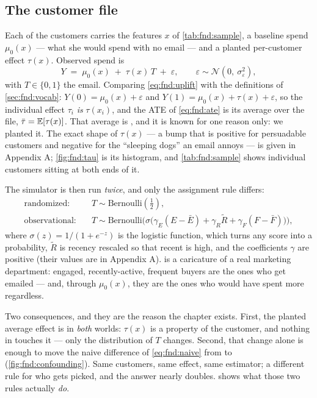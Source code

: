 \subsection*{The customer file}

Each of the \nbZeroNCustomers{} customers carries the features $x$ of \cref{tab:fnd:sample},
a baseline spend $\mu_0(x)$ --- what she would spend with no email --- and a planted
per-customer effect $\tau(x)$. Observed spend is
%
\begin{equation}
  Y \;=\; \mu_0(x) \;+\; \tau(x)\,T \;+\; \varepsilon,
  \qquad \varepsilon \sim \mathcal N\!\left(0,\ \sigma_\varepsilon^{2}\right),
  \label{eq:fnd:uplift}
\end{equation}
%
with $T \in \{0,1\}$ the email. Comparing \cref{eq:fnd:uplift} with the definitions of
\cref{sec:fnd:vocab}: $Y(0) = \mu_0(x) + \varepsilon$ and $Y(1) = \mu_0(x) + \tau(x) +
\varepsilon$, so the individual effect $\tau_i$ \emph{is} $\tau(x_i)$, and the ATE of
\cref{eq:fnd:ate} is its average over the file, $\bar\tau = \operatorname{\mathbb{E}}[\tau(x)]$. That average is
\eur{\nbZeroTrueAte}, and it is known for one reason only: we planted it. The exact shape of
$\tau(x)$ --- a bump that is positive for persuadable customers and negative for the ``sleeping
dogs'' an email annoys --- is given in Appendix A; \cref{fig:fnd:tau} is its histogram, and
\cref{tab:fnd:sample} shows individual customers sitting at both ends of it.

The simulator is then run \emph{twice}, and only the assignment rule differs:
%
\begin{align}
  \text{randomized:}\quad     & T \sim \text{Bernoulli}(\tfrac12), \label{eq:fnd:rct}\\
  \text{observational:}\quad  & T \sim \text{Bernoulli}\Big(\sigma\big(
      \gamma_E (E - \bar E) + \gamma_R \tilde R + \gamma_F (F - \bar F)\big)\Big),
      \label{eq:fnd:obs}
\end{align}
%
where $\sigma(z) = 1/(1 + e^{-z})$ is the logistic function, which turns any score into a
probability, $\tilde R$ is recency rescaled so that recent is high, and the coefficients
$\gamma$ are positive (their values are in Appendix A).  is a caricature of a
real marketing department: engaged, recently-active, frequent buyers are the ones who get
emailed --- and, through $\mu_0(x)$, they are the ones who would have spent more regardless.

Two consequences, and they are the reason the chapter exists. First, the planted average effect
is \eur{\nbZeroTrueAte} in \emph{both} worlds: $\tau(x)$ is a property of the customer, and
nothing in  touches it --- only the distribution of $T$
changes. Second, that change alone is enough to move the naive difference of
\cref{eq:fnd:naive} from \eur{\nbZeroRandNaive} to \eur{\nbZeroObsNaive}
(\cref{fig:fnd:confounding}). Same customers, same effect, same estimator; a different rule for
who gets picked, and the answer nearly doubles.  shows what those two rules
actually \emph{do}.

